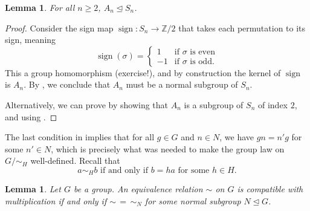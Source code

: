 \documentclass[12pt]{report}
\newtheorem{lemma}[theorem]{Lemma}
\numberwithin{equation}{section}
\numberwithin{theorem}{chapter}
\theoremstyle{definition}
\newtheorem*{basic properties}{Basic Properties}
\newtheorem*{Important Remark}{Important Remark}
\DeclareMathOperator{\sign}{sign}
\newcommand{\Z}{\mathbb{Z}}
\def\norm{\mathrel{\unlhd}}
\begin{document}
\begin{lemma}\label{A_n is normal}
	For all $n \geqslant 2$, $A_n\norm S_n$.
\end{lemma}


\begin{proof}
Consider the sign map $\sign\!\!: S_n \to \Z/2$ that takes each permutation to its sign, meaning
$$\sign(\sigma) = \begin{cases}
	1 & \textrm{if $\sigma$ is even} \\
	-1 & \textrm{if $\sigma$ is odd}.
\end{cases}$$
This a group homomorphism (exercise!), and by construction the kernel of $\sign$ is $A_n$. By , we conclude that $A_n$ must be a normal subgroup of $S_n$.

Alternatively, we can prove  by showing that $A_n$ is a subgroup of $S_n$ of index $2$, and using .
\end{proof}



The last condition in  implies that for all $g \in G$ and $n \in N$, we have $gn = n'g$ for some $n' \in N$, which is precisely what was needed to make the group law on $G/\sim_H$ well-defined. Recall that
$$a \sim_H b \textrm{ if and only if } b = ha \text{ for some } h \in H.$$ 



\begin{lemma} 
Let $G$ be a group. An equivalence relation $\sim$ on $G$ is compatible with multiplication if and only if $\sim \,=  \,\sim_N$ for some normal subgroup $N \norm G$.
\end{lemma}
\end{document}
